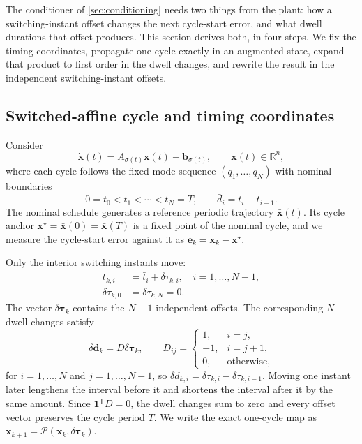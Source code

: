 \documentclass[pdflatex,iicol,sn-mathphys-ay]{sn-jnl}
\newcommand{\R}{\mathbb{R}}
\newcommand{\vect}[1]{\bm{#1}}
\newcommand{\dtau}{\delta\vect{\tau}}
\newcommand{\ddwell}{\delta\vect{d}}
\begin{document}
The conditioner of \cref{sec:conditioning} needs two things from the plant: how a switching-instant offset changes the next cycle-start error, and what dwell durations that offset produces. This section derives both, in four steps. We fix the timing coordinates, propagate one cycle exactly in an augmented state, expand that product to first order in the dwell changes, and rewrite the result in the independent switching-instant offsets.

\subsection{Switched-affine cycle and timing coordinates}

Consider
\begin{equation}
    \dot{\vect{x}}(t)=A_{\sigma(t)}\vect{x}(t)+\vect{b}_{\sigma(t)},
    \qquad \vect{x}(t)\in\R^n,
    \label{eq:plant}
\end{equation}
where each cycle follows the fixed mode sequence $(q_1,\ldots,q_N)$ with nominal boundaries
\begin{equation}
    0=\bar t_0<\bar t_1<\cdots<\bar t_N=T,
    \qquad \bar d_i=\bar t_i-\bar t_{i-1}.
\end{equation}
The nominal schedule generates a reference periodic trajectory $\bar{\vect{x}}(t)$. Its cycle anchor $\vect{x}^{\star}=\bar{\vect{x}}(0)=\bar{\vect{x}}(T)$ is a fixed point of the nominal cycle, and we measure the cycle-start error against it as $\vect{e}_k=\vect{x}_k-\vect{x}^{\star}$.

Only the interior switching instants move:
\begin{equation}
\begin{aligned}
    t_{k,i}&=\bar t_i+\delta\tau_{k,i},\quad i=1,\ldots,N-1,\\
    \delta\tau_{k,0}&=\delta\tau_{k,N}=0.
\end{aligned}
\end{equation}
The vector $\dtau_k$ contains the $N-1$ independent offsets. The corresponding $N$ dwell changes satisfy
\begin{equation}
    \ddwell_k=D\dtau_k,
    \qquad
    D_{ij}=\begin{cases}
        1,&i=j,\\
        -1,&i=j+1,\\
        0,&\text{otherwise},
    \end{cases}
    \label{eq:incidence-map}
\end{equation}
for $i=1,\ldots,N$ and $j=1,\ldots,N-1$, so $\delta d_{k,i}=\delta\tau_{k,i}-\delta\tau_{k,i-1}$. Moving one instant later lengthens the interval before it and shortens the interval after it by the same amount. Since $\vect{1}^{\mathsf T}D=0$, the dwell changes sum to zero and every offset vector preserves the cycle period $T$. We write the exact one-cycle map as $\vect{x}_{k+1}=\mathcal P(\vect{x}_k,\dtau_k)$.
\end{document}
